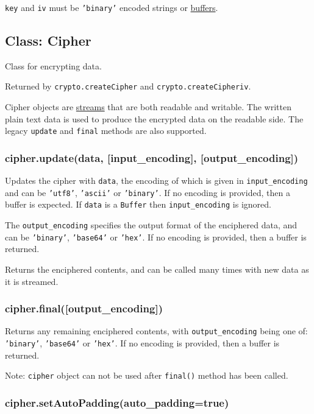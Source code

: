 \texttt{key} and \texttt{iv} must be \texttt{'binary'} encoded strings
or \href{buffer.html}{buffers}.

\subsection{Class: Cipher}\label{class-cipher}

Class for encrypting data.

Returned by \texttt{crypto.createCipher} and
\texttt{crypto.createCipheriv}.

Cipher objects are \href{stream.html}{streams} that are both readable
and writable. The written plain text data is used to produce the
encrypted data on the readable side. The legacy \texttt{update} and
\texttt{final} methods are also supported.

\subsubsection{cipher.update(data, {[}input\_encoding{]},
{[}output\_encoding{]})}\label{cipher.updatedata-inputux5fencoding-outputux5fencoding}

Updates the cipher with \texttt{data}, the encoding of which is given in
\texttt{input\_encoding} and can be \texttt{'utf8'}, \texttt{'ascii'} or
\texttt{'binary'}. If no encoding is provided, then a buffer is
expected. If \texttt{data} is a \texttt{Buffer} then
\texttt{input\_encoding} is ignored.

The \texttt{output\_encoding} specifies the output format of the
enciphered data, and can be \texttt{'binary'}, \texttt{'base64'} or
\texttt{'hex'}. If no encoding is provided, then a buffer is returned.

Returns the enciphered contents, and can be called many times with new
data as it is streamed.

\subsubsection{cipher.final({[}output\_encoding{]})}\label{cipher.finaloutputux5fencoding}

Returns any remaining enciphered contents, with
\texttt{output\_encoding} being one of: \texttt{'binary'},
\texttt{'base64'} or \texttt{'hex'}. If no encoding is provided, then a
buffer is returned.

Note: \texttt{cipher} object can not be used after \texttt{final()}
method has been called.

\subsubsection{cipher.setAutoPadding(auto\_padding=true)}\label{cipher.setautopaddingautoux5fpaddingtrue}

